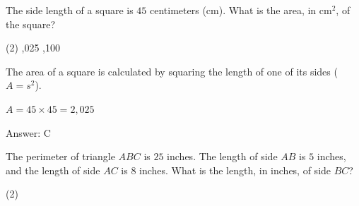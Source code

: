 \documentclass[11pt,paper=a4,answers]{exam}
\begin{document}
\begin{questions}
\pointsinrightmargin
\pointsdroppedatright
\marksnotpoints
{}
\pointformat{\boldmath\themarginpoints}
\bracketedpoints


\question
The side length of a square is $45$ centimeters (cm). What is the area, in cm$^2$, of the square?
\begin{center}
\end{center}
\begin{tasks}(2)
    ,025
    ,100
\end{tasks}

\begin{solution}
The area of a square is calculated by squaring the length of one of its sides ($A = s^2$).
\vspace{5pt}
\begin{center}
$A = 45 \times 45 = 2,025$
\end{center}
\vspace{5pt}
Answer: \colorbox{yellow!100}{C}
\end{solution}

\vspace{1cm}

\question
The perimeter of triangle $ABC$ is $25$ inches. The length of side $AB$ is $5$ inches, and the length of side $AC$ is $8$ inches. What is the length, in inches, of side $BC$?
\begin{center}
\end{center}
\begin{tasks}(2)
\end{tasks}


\end{questions}
\end{document}
